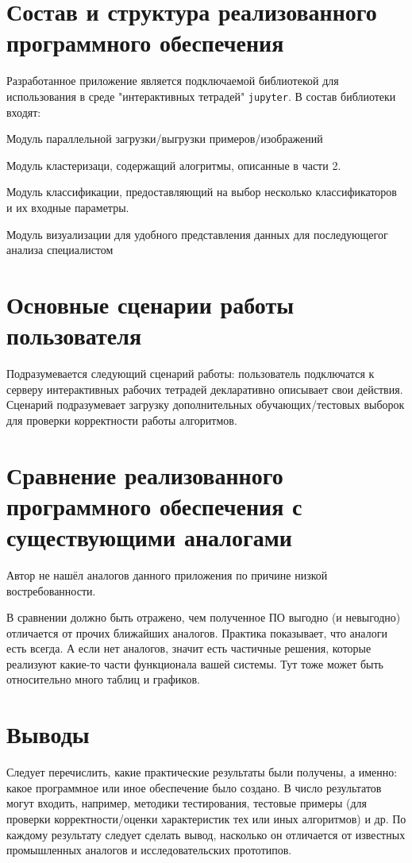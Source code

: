\section{Состав и структура реализованного программного обеспечения}
\begin{annotation}
	Разработанное приложение является подключаемой библиотекой для использования в среде "интерактивных тетрадей" \texttt{jupyter}. В состав библиотеки входят:
	\begin{compactitem}
		\item Модуль параллельной загрузки/выгрузки примеров/изображений
		\item Модуль кластеризаци, содержащий алогритмы, описанные в части 2.
		\item Модуль классификации, предоставляющий на выбор несколько классификаторов и их входные параметры.
		\item Модуль визуализации для удобного представления данных для последующегог анализа специалистом		
	\end{compactitem}
\end{annotation}

\section{Основные сценарии работы пользователя}
\begin{annotation}
	Подразумевается следующий сценарий работы: пользователь подключатся к серверу интерактивных рабочих тетрадей декларативно описывает свои действия. Сценарий подразумевает загрузку дополнительных обучающих/тестовых выборок для проверки корректности работы алгоритмов.
\end{annotation}

\section{Сравнение реализованного программного обеспечения с существующими аналогами}
\begin{annotation}
	Автор не нашёл аналогов данного приложения по причине низкой востребованности.
\end{annotation}

В сравнении должно быть отражено, чем полученное ПО выгодно (и невыгодно) отличается от прочих ближайших аналогов. Практика показывает, что аналоги есть всегда. А если нет аналогов, значит есть частичные решения, которые реализуют какие-то части функционала вашей системы. Тут тоже может быть относительно много таблиц и графиков.



\section{Выводы}

Следует перечислить, какие практические результаты были получены, а именно: какое программное или иное обеспечение было создано. В число результатов могут входить, например, методики тестирования, тестовые примеры (для проверки корректности/оценки характеристик тех или иных алгоритмов) и др. По каждому результату следует сделать вывод, насколько он отличается от известных промышленных аналогов и исследовательских прототипов.

